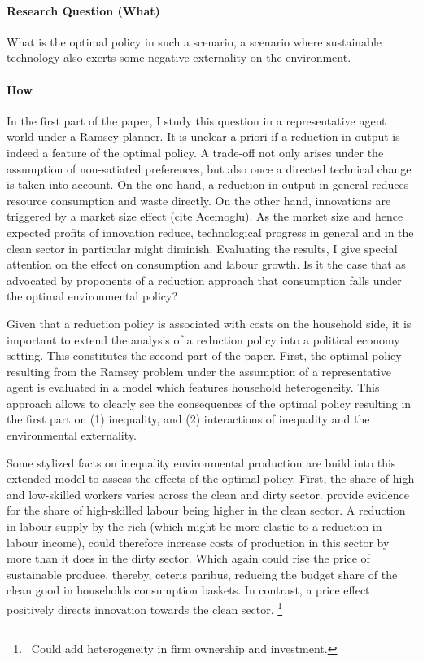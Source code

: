 \documentclass[12pt]{article}
\newcommand{\ar}{$\Rightarrow$ \ }
\begin{document}
\paragraph{Research Question (What)}
 What is the optimal policy in such a scenario, a scenario where sustainable technology also exerts some negative externality on the environment.

\paragraph{How}
In the first part of the paper, I study this question in a representative agent world under a Ramsey planner. 
It is unclear a-priori if a reduction in output is indeed  a feature of the optimal policy. A trade-off not only arises under the assumption of non-satiated preferences, but also once a directed technical change is taken into account. 
On the one hand, a reduction in output in general reduces resource consumption and waste directly. On the other hand, innovations are triggered by a market size effect (cite Acemoglu). As the market size and hence expected profits of innovation reduce, technological progress in general and in the clean sector in particular might diminish. 
Evaluating the results, I give special attention on the effect on consumption and labour growth. Is it the case that as advocated by proponents of a reduction approach that consumption falls under the optimal environmental policy? 

Given that a reduction policy is associated with costs on the household side, it is important to extend the analysis of a reduction policy into a political economy setting. This constitutes the second part of the paper. 
First, the optimal policy resulting from the Ramsey problem under the assumption of a representative agent is evaluated in a model which features household heterogeneity. This approach allows to clearly see the consequences of the optimal policy resulting in the first part on (1) inequality, and (2) interactions of  inequality and the environmental externality. 

Some stylized facts on inequality environmental production are build into this extended model to assess  the effects of the optimal policy. First, the share of high and low-skilled workers varies across the clean and dirty sector. \cite{Bowen2018CharacterisingComposition, Consoli2016DoCapital} provide evidence for the share of high-skilled labour being higher in the clean sector. A reduction in labour supply by the rich (which might be more elastic to a reduction in labour income), could therefore increase costs of production in this sector by more than it does in the dirty sector. Which again could rise the price of sustainable produce, thereby, ceteris paribus, reducing the budget share of the clean good in households consumption baskets. In contrast, a price effect positively directs innovation towards the clean sector. 
\footnote{\ Could add heterogeneity in firm ownership and investment. }
\end{document}

